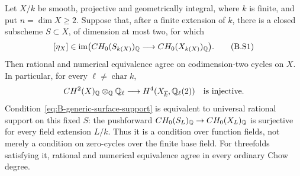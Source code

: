\begin{proposition}
\label{prop:B-surface-supported-CH2}
Let \(X/k\) be smooth, projective and geometrically integral, where
\(k\) is finite, and put \(n=\dim X\geq2\).
Suppose that, after a finite extension of \(k\), there is a closed
subscheme \(S\subset X\), of dimension at most two, for which
\[
 [\eta_X]\in\operatorname{im}\bigl(
 CH_0(S_{k(X)})_{\mathbb Q}\longrightarrow
 CH_0(X_{k(X)})_{\mathbb Q}\bigr).
 \tag{B.S1}\label{eq:B-generic-surface-support}
\]
Then rational and numerical equivalence agree on codimension-two
cycles on \(X\).  In particular, for every \(\ell\ne\operatorname{char}k\),
\[
 CH^2(X)_{\mathbb Q}\otimes_{\mathbb Q}\mathbb Q_\ell\longrightarrow
 H^4(X_{\overline k},\mathbb Q_\ell(2))
 \quad\hbox{is injective}.
\]
Condition~\eqref{eq:B-generic-surface-support} is equivalent to
universal rational support on this fixed \(S\): the pushforward
\(CH_0(S_L)_{\mathbb Q}\to CH_0(X_L)_{\mathbb Q}\) is surjective for every
field extension \(L/k\).  Thus it is a condition over function
fields, not merely a condition on zero-cycles over the finite base
field.  For threefolds satisfying it, rational and numerical
equivalence agree in every ordinary Chow degree.
\end{proposition}
